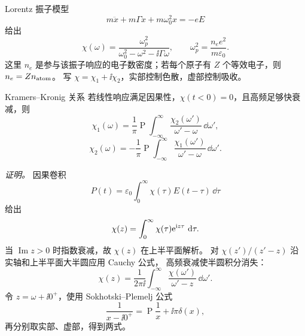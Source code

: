 Lorentz 振子模型
\[
 m\ddot x+m\Gamma\dot x+m\omega_0^2x=-eE
\]
给出
\[
 \chi(\omega)=
 \frac{\omega_p^2}{\omega_0^2-\omega^2-\ii\Gamma\omega},
\qquad
 \omega_p^2=\frac{n_ee^2}{m\varepsilon_0}.
\]
这里 $n_e$ 是参与该振子响应的电子数密度；若每个原子有 $Z$ 个等效电子，则 $n_e=Zn_{\rm atom}$。
写 $\chi=\chi_1+\ii\chi_2$，实部控制色散，虚部控制吸收。

\begin{advtheorem}{Kramers--Kronig 关系}\label{advA6:thm:kramers-kronig}
若线性响应满足因果性，$\chi(t<0)=0$，且高频足够快衰减，则
\[
 \boxed{\chi_1(\omega)=\frac1\pi
 \operatorname P\!\int_{-\infty}^{\infty}
 \frac{\chi_2(\omega')}{\omega'-\omega}\,\dd\omega'},
\]
\[
 \boxed{\chi_2(\omega)=-\frac1\pi
 \operatorname P\!\int_{-\infty}^{\infty}
 \frac{\chi_1(\omega')}{\omega'-\omega}\,\dd\omega'}.
\]
\end{advtheorem}

\noindent\textit{证明。}
因果卷积
\[
 P(t)=\varepsilon_0\int_0^\infty\chi(\tau)E(t-\tau)\,\dd\tau
\]
给出
\[
 \chi(z)=\int_0^\infty\chi(\tau)\mathrm e^{\mathrm i z\tau}\,\mathop{}\!\mathrm d\tau .
\]
当 $\operatorname{Im}z>0$ 时指数衰减，故 $\chi(z)$ 在上半平面解析。
对
$\chi(z')/(z'-z)$ 沿实轴和上半平面大半圆应用 Cauchy 公式，
高频衰减使半圆积分消失：
\[
 \chi(z)=\frac1{2\pi\ii}
 \int_{-\infty}^{\infty}\frac{\chi(\omega')}{\omega'-z}\,\dd\omega'.
\]
令 $z=\omega+\ii0^+$，使用 Sokhotski--Plemelj 公式
\[
 \frac1{x-\ii0^+}=\operatorname P\frac1x+\ii\pi\delta(x),
\]
再分别取实部、虚部，得到两式。

